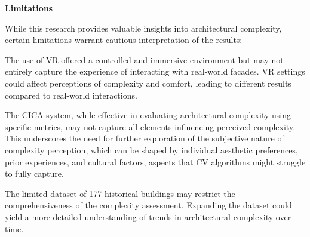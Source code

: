 \textbf{Limitations}

While this research provides valuable insights into architectural complexity, certain limitations warrant cautious interpretation of the results:



The use of VR offered a controlled and immersive environment but may not entirely capture the experience of interacting with real-world facades.
VR settings could affect perceptions of complexity and comfort, leading to different results compared to real-world interactions.

The CICA system, while effective in evaluating architectural complexity using specific metrics, may not capture all elements influencing perceived complexity.
This underscores the need for further exploration of the subjective nature of complexity perception, which can be shaped by individual aesthetic preferences, prior experiences, and cultural factors, aspects that CV algorithms might struggle to fully capture.

The limited dataset of 177 historical buildings may restrict the comprehensiveness of the complexity assessment.
Expanding the dataset could yield a more detailed understanding of trends in architectural complexity over time.

